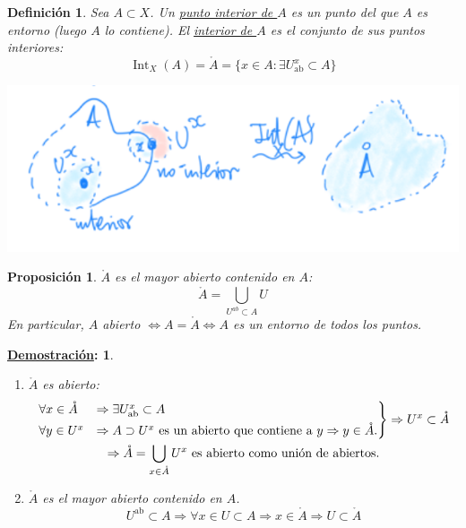 \documentclass[10pt,a4paper,openright]{book}
\theoremstyle{break}
\newtheorem*{defi}{Definición}
\newtheorem*{prop}{Proposición}
\newtheorem*{demo}{\underline{Demostración}:}
\DeclareMathOperator{\inter}{Int}
\begin{document}
\begin{defi}
Sea $A \subset X$. Un \underline{punto interior de $A$} es un punto del que $A$ es entorno (luego $A$ lo contiene). El \underline{interior de $A$} es el conjunto de sus puntos interiores:
\[
\inter_X \left( A \right) = \mathring{A} = \{x \in A: \exists U_{\text{ab}}^x \subset A\} 
\]
\end{defi}
\begin{center}
    \includegraphics[scale=0.4]{images/def_interior} 
\end{center}

\begin{prop}
$\mathring{A}$ es el mayor abierto contenido en $A$: 
\[
\mathring{A} = \bigcup_{U^{ab} \subset A} U
\]
En particular, $A$ abierto $\Leftrightarrow A = \mathring{A} \Leftrightarrow A$ es un entorno de todos los puntos.    
\end{prop}
\begin{demo}
\begin{enumerate}
    \item $\mathring{A}$ es abierto: 
    \begin{gather*}
        \begin{rcases}
        \forall x \in \mathring{A} &\Rightarrow \exists U_{\text{ab}}^x \subset A\\
        \forall y \in U^x &\Rightarrow A \supset U^x \text{ es un abierto que contiene a } y \Rightarrow y \in \mathring{A}.\\
        \end{rcases} \Rightarrow U^x \subset \mathring{A}\\
        \Rightarrow \mathring{A} = \bigcup_{x \in \mathring{A}} U^x \text{ es abierto como unión de abiertos}
    .\end{gather*}
    \item $\mathring{A}$ es el mayor abierto contenido en $A$.
    \[
    U^{\text{ab}} \subset A \Rightarrow \forall x \in U \subset A \Rightarrow x \in \mathring{A} \Rightarrow U \subset \mathring{A} 
    \]
\end{enumerate}
\end{demo}
\end{document}
